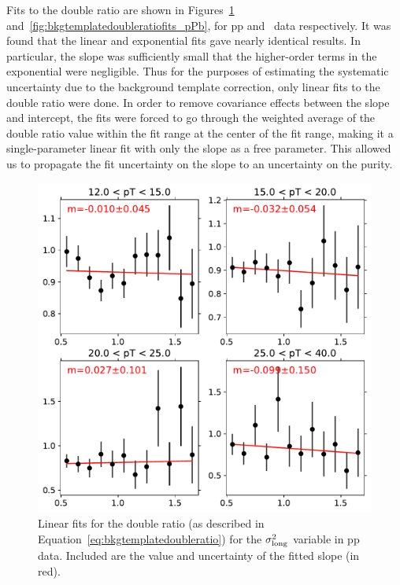 Fits to the double ratio are shown in Figures~\ref{fig:bkgtemplatedoubleratiofits_pp} and~\ref{fig:bkgtemplatedoubleratiofits_pPb}, for pp and \pPb~data respectively. It was found that the linear and exponential fits gave nearly identical results. In particular, the slope was sufficiently small that the higher-order terms in the exponential were negligible. Thus for the purposes of estimating the systematic uncertainty due to the background template correction, only linear fits to the double ratio were done. In order to remove covariance effects between the slope and intercept, the fits were forced to go through the weighted average of the double ratio value within the fit range at the center of the fit range, making it a single-parameter linear fit with only the slope as a free parameter. This allowed us to propagate the fit uncertainty on the slope to an uncertainty on the purity.


\begin{figure}[htpb]
    \centering
    \includegraphics[width=\textwidth]{Data_Analysis/Purity/single-linear-fits-pp}
    \caption{Linear fits for the double ratio (as described in Equation~\ref{eq:bkgtemplatedoubleratio}) for the $\sigma^{2}_{\mathrm{long}}$ variable in pp data.  Included are the value and uncertainty of the fitted slope (in red).}
    \label{fig:bkgtemplatedoubleratiofits_pp}
\end{figure}


